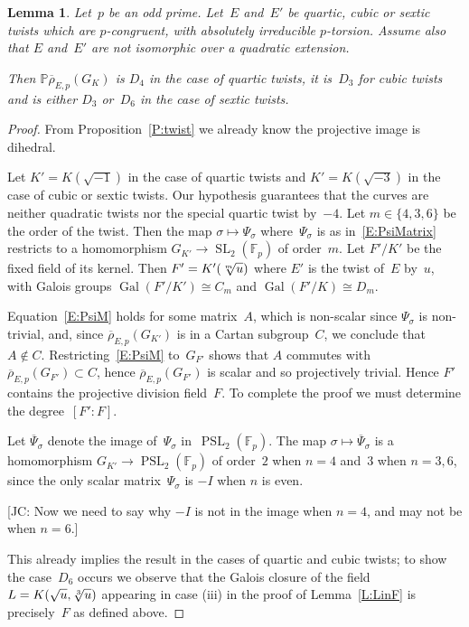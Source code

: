 \documentclass[12pt, reqno]{amsart}
\newcommand{\F}{\mathbb{F}}
\newcommand{\PP}{\mathbb{P}}
\newcommand{\rhobar}{{\overline{\rho}}}
\DeclareMathOperator{\Gal}{Gal}
\newcommand{\PSL}{\operatorname{PSL}}
\newcommand{\SL}{\operatorname{SL}}
\numberwithin{equation}{section}
\newtheorem{lemma}[theorem]{Lemma}
\theoremstyle{definition}
\theoremstyle{remark}
\newcommand{\jc}[1]{{\color{darkgreen} \textsf{[JC: #1]}}}
\begin{document}
\begin{lemma}\label{L:dihedral}
Let~$p$ be an odd prime. Let~$E$ and~$E'$ be quartic, cubic or sextic
twists which are $p$-congruent, with absolutely irreducible
$p$-torsion. Assume also that $E$ and~$E'$ are not isomorphic over a
quadratic extension.

Then $\PP\rhobar_{E,p}(G_K)$ is $D_4$ in the case of quartic twists,
it is~$D_3$ for cubic twists and is either $D_3$ or~$D_6$ in the case
of sextic twists.
\end{lemma}
\begin{proof} From Proposition~\ref{P:twist} we already know the
  projective image is dihedral.

Let $K'=K(\sqrt{-1})$ in the case of quartic twists and
$K'=K(\sqrt{-3})$ in the case of cubic or sextic twists. Our
hypothesis guarantees that the curves are neither quadratic twists nor
the special quartic twist by~$-4$.  Let $m\in\{4,3,6\}$ be the order
of the twist.  Then the map $\sigma \mapsto \Psi_\sigma$
where~$\Psi_\sigma$ is as in~\eqref{E:PsiMatrix} restricts to a homomorphism
$G_{K'}\to\SL_2(\F_p)$ of order~$m$.  Let $F'/K'$ be the fixed field
of its kernel.  Then $F'=K'(\root m\of u)$ where $E'$ is the twist
of~$E$ by~$u$, with Galois groups $\Gal(F'/K')\cong C_m$ and
$\Gal(F'/K)\cong D_m$.

Equation~\eqref{E:PsiM} holds for some matrix~$A$, which is non-scalar
since $\Psi_{\sigma}$ is non-trivial, and, since
$\rhobar_{E,p}(G_{K'})$ is in a Cartan subgroup~$C$, we conclude that
$A \not\in C$. Restricting~\eqref{E:PsiM} to~$G_{F'}$ shows that $A$
commutes with $\rhobar_{E,p}(G_{F'}) \subset C$, hence
$\rhobar_{E,p}(G_{F'})$ is scalar and so projectively trivial.  Hence
$F'$ contains the projective division field~$F$.  To complete the
proof we must determine the degree~$[F':F]$.

Let $\overline{\Psi}_{\sigma}$ denote the image of~$\Psi_{\sigma}$
in~$\PSL_2(\F_p)$.  The map $\sigma \mapsto \overline{\Psi}_\sigma$ is
a homomorphism $G_{K'}\to\PSL_2(\F_p)$ of order~$2$ when $n=4$ and~$3$
when $n=3,6$, since the only scalar matrix~$\Psi_{\sigma}$ is $-I$
when $n$ is even.


\jc{Now we need to say why $-I$ is not in the image when $n=4$, and
  may not be when $n=6$.}

This already implies the result in the cases of quartic and cubic
twists; to show the case~$D_6$ occurs we observe that the Galois
closure of the field~$L=K(\sqrt{u},\root 3 \of u)$ appearing in case
(iii) in the proof of Lemma~\ref{L:LinF} is precisely~$F$ as defined
above.
\end{proof}
\end{document}
